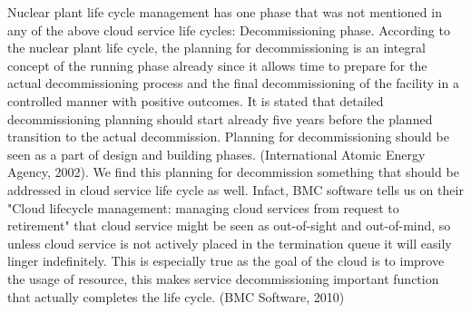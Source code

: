 \documentclass{article}
\begin{document}
\par
Nuclear plant life cycle management has one phase that was not mentioned in any of the above cloud service life cycles: Decommissioning phase. According to the nuclear plant life cycle, the planning for decommissioning is an integral concept of the running phase already since it allows time to prepare for the actual decommissioning process and the final decommissioning of the facility in a controlled manner with positive outcomes. It is stated that detailed decommissioning planning should start already five years before the planned transition to the actual decommission. Planning for decommissioning should be seen as a part of design and building phases. (International Atomic Energy Agency, 2002). We find this planning for decommission something that should be addressed in cloud service life cycle as well. Infact, BMC software tells us on their "Cloud lifecycle management: managing cloud services from request to retirement" that cloud service might be seen as out-of-sight and out-of-mind, so unless cloud service is not actively placed in the termination queue it will easily linger indefinitely. This is especially true as the goal of the cloud is to improve the usage of resource, this makes service decommissioning important function that actually completes the life cycle. (BMC Software, 2010)
\end{document}
